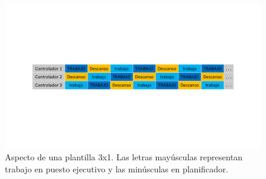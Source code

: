 \begin{figure}
	\centering
	\includegraphics[width=\linewidth]{capitulos/Capitulo3-Metodologia-propuesta/recursos/Plantilla-3x1}
	\caption[Aspecto de una plantilla 3x1]{Aspecto de una plantilla 3x1. Las letras mayúsculas representan trabajo en 
	puesto ejecutivo y las minúsculas en planificador.}
	\label{fig:3:plantilla-3x1}
\end{figure}








